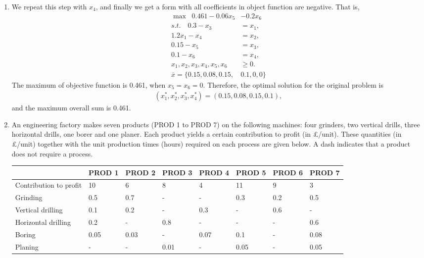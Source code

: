 \documentclass[12pt,a4paper]{article}
\makeatletter
\newtheorem*{solution}{Solution}
\theoremstyle{definition}
\renewenvironment{solution}[1][Solution] {\par\pushQED{\qed}\normalfont\topsep6\p@\@plus6\p@\relax\trivlist\item[\hskip\labelsep\bfseries#1\@addpunct{.}]\ignorespaces}{\popQED\endtrivlist\@endpefalse} \makeatother
\makeatother
\begin{document}
\begin{enumerate}
\begin{solution}
\begin{enumerate}
		We repeat this step with $x_4$, and finally we get a form with all coefficients in object function are negative. That is,
		\begin{align*}
		\max\;\; 0.461-0.06x_5&-0.2x_6\\
		s.t. \quad 0.3-x_3&=x_1,\\
		1.2x_1-x_4&=x_2,\\
		0.15-x_5&=x_3,\\
		0.1-x_6&=x_4,\\
		x_1,x_2,x_3,x_4,x_5,x_6&\geq0.\\
		\overline{x}=\{0.15,0.08,0.15,&0.1,0,0\}
		\end{align*} 
	The maximum of objective function is 0.461, when $x_5=x_6=0$. Therefore, the optimal solution for the original problem is 
	\begin{align*}
		(x_1^*,x_2^*,x_3^*,x_4^*)=(0.15,0.08,0.15,0.1),
	\end{align*}
	and the  maximum overall sum is 0.461.
		\end{enumerate}
		 
	\end{solution}
    \item
    An engineering factory makes seven products (PROD 1 to PROD 7) on the following machines: four grinders, two vertical drills, three horizontal drills, one borer and one planer. Each product yields a certain contribution to profit (in \pounds/unit). These quantities (in \pounds/unit) together with the unit production times (hours) required on each process are given below. A dash indicates that a product does not require a process.

    \begin{table}[htbp]
      \scriptsize
      \centering
      \renewcommand\arraystretch{1.1}
      \begin{tabular}{m{} m{}<{\centering} m{}<{\centering} m{}<{\centering} m{}<{\centering} m{}<{\centering} m{}<{\centering} m{}<{\centering}}
      \hline
       & \textbf{PROD 1} & \textbf{PROD 2} & \textbf{PROD 3} & \textbf{PROD 4} & \textbf{PROD 5} & \textbf{PROD 6} &  \textbf{PROD 7} \\\hline
      Contribution to profit & 10 & 6 & 8 & 4 & 11 & 9 & 3 \\
      Grinding & 0.5 & 0.7 & - & - & 0.3 & 0.2 & 0.5 \\
      Vertical drilling & 0.1 & 0.2 & - & 0.3 & - & 0.6 & - \\
      Horizontal drilling & 0.2 & - & 0.8 & - & - & - & 0.6 \\
      Boring & 0.05 & 0.03 & - & 0.07 & 0.1 & - & 0.08 \\
      Planing & - & - & 0.01 & - & 0.05 & - & 0.05 \\
      \hline
      \end{tabular}
    \end{table}


\end{enumerate}
\end{document}
